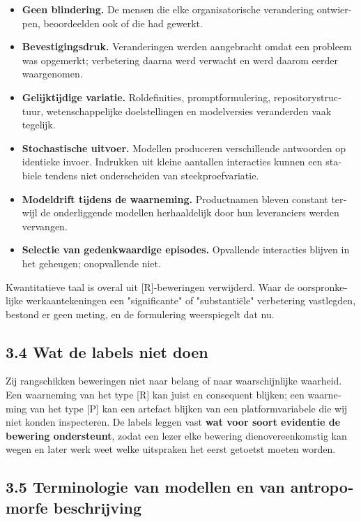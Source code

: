 \begin{dutch}
\begin{itemize}
  \item \textbf{Geen blindering.} De mensen die elke organisatorische verandering ontwierpen, beoordeelden ook of die had gewerkt.
  \item \textbf{Bevestigingsdruk.} Veranderingen werden aangebracht omdat een probleem was opgemerkt; verbetering daarna werd verwacht en werd daarom eerder waargenomen.
  \item \textbf{Gelijktijdige variatie.} Roldefinities, promptformulering, repositorystructuur, wetenschappelijke doelstellingen en modelversies veranderden vaak tegelijk.
  \item \textbf{Stochastische uitvoer.} Modellen produceren verschillende antwoorden op identieke invoer. Indrukken uit kleine aantallen interacties kunnen een stabiele tendens niet onderscheiden van steekproefvariatie.
  \item \textbf{Modeldrift tijdens de waarneming.} Productnamen bleven constant terwijl de onderliggende modellen herhaaldelijk door hun leveranciers werden vervangen.
  \item \textbf{Selectie van gedenkwaardige episodes.} Opvallende interacties blijven in het geheugen; onopvallende niet.
\end{itemize}
Kwantitatieve taal is overal uit [R]-beweringen verwijderd. Waar de oorspronkelijke werkaantekeningen een "significante" of "substantiële" verbetering vastlegden, bestond er geen meting, en de formulering weerspiegelt dat nu.


\subsection*{3.4 Wat de labels niet doen}
\label{sec:nl:3.4}

Zij rangschikken beweringen niet naar belang of naar waarschijnlijke waarheid. Een waarneming van het type [R] kan juist en consequent blijken; een waarneming van het type [P] kan een artefact blijken van een platformvariabele die wij niet konden inspecteren. De labels leggen vast \textbf{wat voor soort evidentie de bewering ondersteunt}, zodat een lezer elke bewering dienovereenkomstig kan wegen en later werk weet welke uitspraken het eerst getoetst moeten worden.


\subsection*{3.5 Terminologie van modellen en van antropomorfe beschrijving}
\label{sec:nl:3.5}


\end{dutch}

